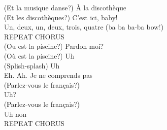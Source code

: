 (Et la musique danse?) À la discothèque\\
(Et les discothèques?) C'est ici, baby!\\
Un, deux, un, deux, trois, quatre (ba ba ba-ba bow!)\\
REPEAT CHORUS\\
(Ou est la piscine?) Pardon moi?\\
(Où est la piscine?) Uh\\
(Splish-splash) Uh\\
Eh. Ah. Je ne comprends pas\\
(Parlez-vous le français?)\\
Uh?\\
(Parlez-vous le français?)\\
Uh  non\\
REPEAT CHORUS
